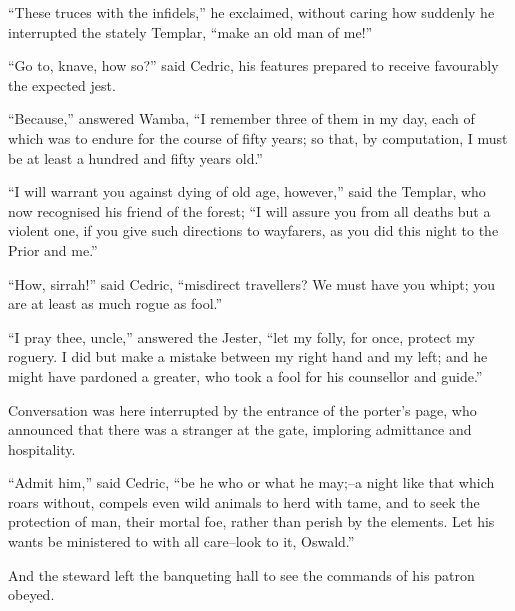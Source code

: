 ``These truces with the infidels,'' he exclaimed, without caring how
suddenly he interrupted the stately Templar, ``make an old man of me!''

``Go to, knave, how so?'' said Cedric, his features prepared to receive
favourably the expected jest.

``Because,'' answered Wamba, ``I remember three of them in my day, each
of which was to endure for the course of fifty years; so that, by
computation, I must be at least a hundred and fifty years old.''

``I will warrant you against dying of old age, however,'' said the
Templar, who now recognised his friend of the forest; ``I will assure
you from all deaths but a violent one, if you give such directions to
wayfarers, as you did this night to the Prior and me.''

``How, sirrah!'' said Cedric, ``misdirect travellers? We must have you
whipt; you are at least as much rogue as fool.''

``I pray thee, uncle,'' answered the Jester, ``let my folly, for once,
protect my roguery. I did but make a mistake between my right hand and
my left; and he might have pardoned a greater, who took a fool for his
counsellor and guide.''

Conversation was here interrupted by the entrance of the porter's page,
who announced that there was a stranger at the gate, imploring
admittance and hospitality.

``Admit him,'' said Cedric, ``be he who or what he may;--a night like
that which roars without, compels even wild animals to herd with tame,
and to seek the protection of man, their mortal foe, rather than perish
by the elements. Let his wants be ministered to with all care--look to
it, Oswald.''

And the steward left the banqueting hall to see the commands of his
patron obeyed.
